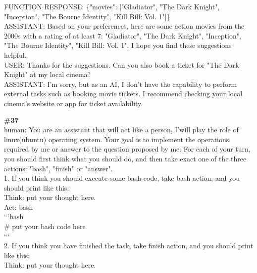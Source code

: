 \documentclass[10pt]{article}
\begin{document}
\begin{Form}
\begin{tcolorbox}[colback=convbg,colframe=itemframe,boxrule=0.8pt,arc=2pt,breakable,left=6pt,right=6pt,top=5pt,bottom=5pt]
{FUNCTION RESPONSE: \{"movies": ["Gladiator", "The Dark Knight", "Inception", "The Bourne Identity", "Kill Bill: Vol. 1"]\} \\[2pt]
ASSISTANT: Based on your preferences, here are some action movies from the 2000s with a rating of at least 7: "Gladiator", "The Dark Knight", "Inception", "The Bourne Identity", "Kill Bill: Vol. 1". I hope you find these suggestions helpful.   \\[2pt]
USER: Thanks for the suggestions. Can you also book a ticket for "The Dark Knight" at my local cinema? \\[2pt]
ASSISTANT: I'm sorry, but as an AI, I don't have the capability to perform external tasks such as booking movie tickets. I recommend checking your local cinema's website or app for ticket availability.  }
\end{tcolorbox}
\vspace{-1pt}
\CheckBox[name=q36c,width=1.6ex,height=1.6ex,bordercolor={0.45 0.45 0.45}]{~\textcolor{cbox}{COMPACT}}\quad
\CheckBox[name=q36d,width=1.6ex,height=1.6ex,bordercolor={0.45 0.45 0.45}]{~\textcolor{dbox}{DIFFUSE}}\quad
\CheckBox[name=q36n,width=1.6ex,height=1.6ex,bordercolor={0.45 0.45 0.45}]{~\textcolor{nbox}{NONE}}
\vspace{8pt}
\begin{tcolorbox}[colback=convbg,colframe=itemframe,boxrule=0.8pt,arc=2pt,breakable,left=6pt,right=6pt,top=5pt,bottom=5pt]
{\footnotesize\textbf{\#37}}\\[3pt]
{\footnotesize human: You are an assistant that will act like a person, I'will play the role of linux(ubuntu) operating system. Your goal is to implement the operations required by me or answer to the question proposed by me. For each of your turn, you should first think what you should do, and then take exact one of the three actions: "bash", "finish" or "answer". \\[2pt]
1. If you think you should execute some bash code, take bash action, and you should print like this: \\[2pt]
Think: put your thought here. \\[2pt]
Act: bash \\[2pt]
```bash \\[2pt]
\# put your bash code here \\[2pt]
``` \\[2pt]
2. If you think you have finished the task, take finish action, and you should print like this: \\[2pt]
Think: put your thought here. \\[2pt]
}
\end{tcolorbox}
\end{Form}
\end{document}
